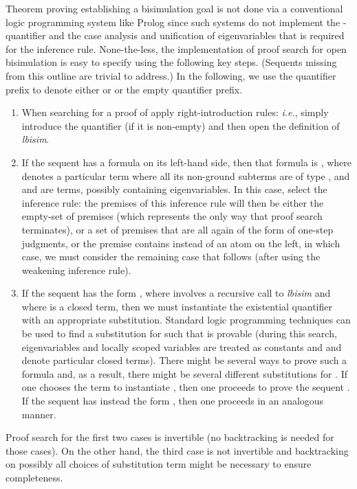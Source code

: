 \documentclass{acmtrans2m}
\begin{document}
Theorem proving establishing a bisimulation goal is not done via a
conventional logic programming system like Prolog since such
systems do not implement the -quantifier and the case analysis
and unification of eigenvariables that is required for the 
inference rule.  None-the-less, the implementation of proof search for
open bisimulation is easy to specify using the following key steps.
(Sequents missing from this outline are trivial to address.)  In the
following, we use the quantifier prefix  to denote either
 or  or the empty quantifier prefix.
\begin{enumerate}

\item When searching for a proof of
 apply
right-introduction rules: {\em i.e.}, simply introduce the quantifier
 (if it is non-empty) and then open the definition of
{\sl lbisim}.

\item If the sequent has a formula on its left-hand side, then that
formula is , where  denotes a
particular term where all its non-ground subterms are of type , 
and  and  are terms, possibly containing eigenvariables.  In this
case, select the  inference rule: the premises of this
inference rule will then be either  the empty-set of premises
(which represents the only way that proof search terminates), or
 a set of premises that are all again of the form of one-step
judgments, or 
the premise contains  instead of an atom on the left, in which
case, we must consider the remaining case that follows (after using
the weakening  inference rule).

\item If the sequent has the form
, where  involves a recursive call to {\sl
lbisim} and where  is a closed term, then we must instantiate the
existential quantifier with an appropriate substitution.  Standard
logic programming techniques can be
used to find a substitution for  such that  is
provable (during this search, eigenvariables and locally scoped
variables are treated as constants and  and  denote particular
closed terms).  There might be several ways to prove such a formula
and, as a result, there might be several different substitutions for
.  If one chooses the term  to instantiate , then one proceeds
to prove the sequent
.  
If the sequent has instead the form , then one proceeds in an analogous manner.
\end{enumerate}
Proof search for the first two cases is invertible (no backtracking is
needed for those cases).  On the other hand, the third
case is not invertible and backtracking on possibly all choices of
substitution term  might be necessary to ensure completeness.
\end{document}
